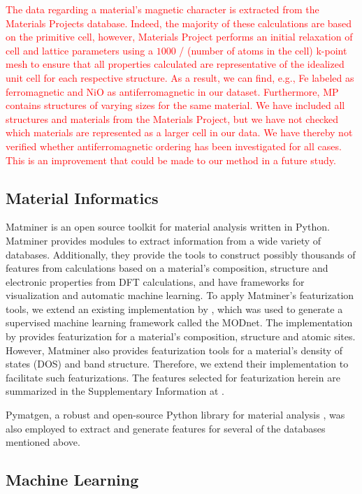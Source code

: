 \documentclass[superscriptaddress,unsortedaddress,
 amsmath,amssymb,
 aps,
]{revtex4-2}
\newcommand{\mrk}[1]{\textcolor{red}{#1}}
\begin{document}
\mrk{The data regarding a material's magnetic character is extracted from the Materials Projects database. Indeed, the majority of these calculations are based on the primitive cell, however, Materials Project performs an initial relaxation of cell and lattice parameters using a $1000$ / (number of atoms in the cell) k-point mesh to ensure that all properties calculated are representative of the idealized unit cell for each respective structure. As a result, we can find, e.g., Fe labeled as ferromagnetic and NiO as antiferromagnetic in our dataset. Furthermore, MP contains structures of varying sizes for the same material. We have included all structures and materials from the Materials Project, but we have not checked which materials are represented as a larger cell in our data. We have thereby not verified whether antiferromagnetic ordering has been investigated for all cases. This is an improvement that could be made to our method in a future study.} 

\subsection*{Material Informatics}  
Matminer \cite{Ward2018} is an open source toolkit for material analysis written in Python. Matminer provides modules to extract information from a wide variety of databases. Additionally, they provide the tools to construct possibly thousands of features from calculations based on a material's composition, structure and electronic properties from DFT calculations, and have frameworks for visualization and automatic machine learning. 
To apply Matminer's featurization tools, we extend an existing implementation by \citeauthor{Breuck2021} \cite{Breuck2021}, which was used to generate a supervised machine learning framework called the MODnet. The implementation by \citeauthor{Breuck2021} provides featurization for a material's composition, structure and atomic sites. However, Matminer also provides featurization tools for a material's density of states (DOS) and band structure. Therefore, we extend their implementation to facilitate such featurizations. The features selected for featurization herein are summarized in the Supplementary Information at \cite{supplementary}. 

Pymatgen, a robust and open-source Python library for material analysis \cite{pymatgen}, was also employed to extract and generate features for several of the databases mentioned above. 

\subsection*{Machine Learning} 
\end{document}
